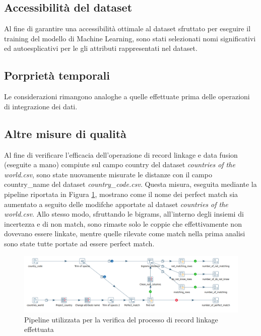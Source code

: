 \subsection{Accessibilità del dataset}
Al fine di garantire una accessibilità ottimale al dataset sfruttato per eseguire il training del modello di Machine Learning, sono stati selezionati nomi significativi ed autoesplicativi per le gli attributi rappresentati nel dataset.

\subsection{Porprietà temporali}
Le considerazioni rimangono analoghe a quelle effettuate prima delle operazioni di integrazione dei dati.

\subsection{Altre misure di qualità}
Al fine di verificare l'efficacia dell'operazione di record linkage e data fusion (eseguite a mano) compiute sul campo country del dataset \textit{countries of the world.csv}, sono state nuovamente misurate le distanze con il campo country\_name del dataset \textit{country\_code.csv}. Questa misura, eseguita mediante la pipeline riportata in Figura \ref{fig:qdtrecordlinkage}, mostrano come il nome dei perfect match sia aumentato a seguito delle modifche apportate al dataset \textit{countries of the world.csv}. Allo stesso modo, sfruttando le bigrams, all'interno degli insiemi di incertezza e di non match, sono rimaste solo le coppie che effettivamente non dovevano essere linkate, mentre quelle rilevate come match nella prima analisi sono state tutte portate ad essere perfect match.

\begin{figure}[h!]
	\centering
	\includegraphics[width=1\linewidth]{images/QDT_recordlinkage}
	\caption{Pipeline utilizzata per la verifica del processo di record linkage effettuata}
	\label{fig:qdtrecordlinkage}
\end{figure}


